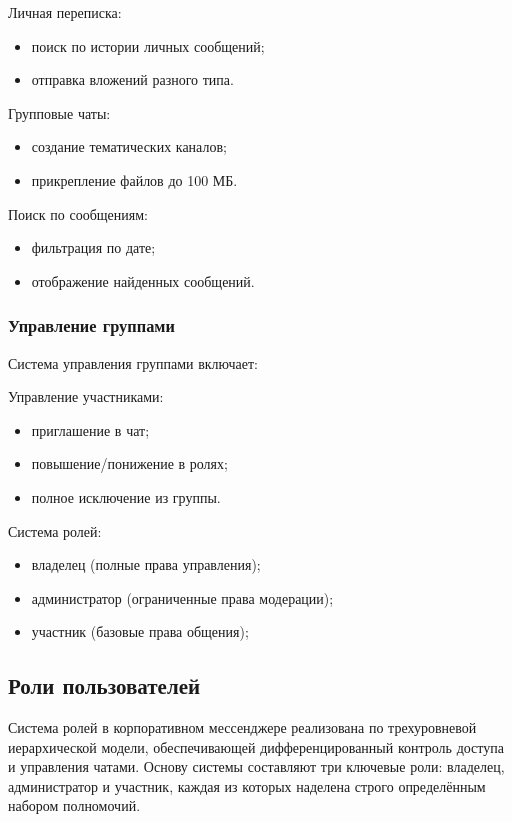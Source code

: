 Личная переписка:

	\begin{itemize}
		\item поиск по истории личных сообщений;
		\item отправка вложений разного типа.
	\end{itemize}
	
Групповые чаты:

	\begin{itemize}
		\item создание тематических каналов;
		\item прикрепление файлов до 100 МБ.
	\end{itemize}
	
Поиск по сообщениям:

	\begin{itemize}
		\item фильтрация по дате;
		\item отображение найденных сообщений.
	\end{itemize}
	
\subsubsection{Управление группами}

Система управления группами включает:
	
Управление участниками:

	\begin{itemize}
		\item приглашение в чат;
		\item повышение/понижение в ролях;
		\item полное исключение из группы.
	\end{itemize}
	
Система ролей:

	\begin{itemize}
		\item владелец (полные права управления);
		\item администратор (ограниченные права модерации);
		\item участник (базовые права общения);
	\end{itemize}
	

\subsection{Роли пользователей}

Система ролей в корпоративном мессенджере реализована по трехуровневой иерархической модели, обеспечивающей дифференцированный контроль доступа и управления чатами. Основу системы составляют три ключевые роли: владелец, администратор и участник, каждая из которых наделена строго определённым набором полномочий.

